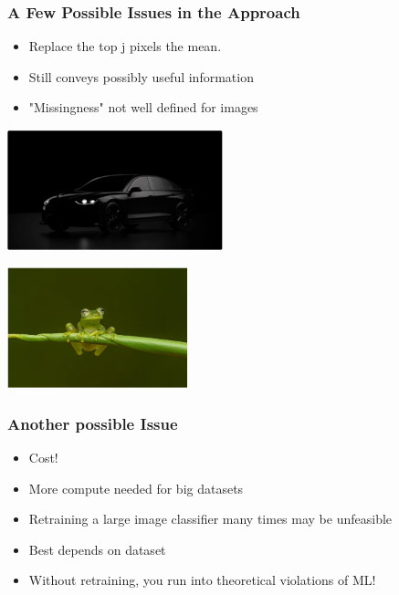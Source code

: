 \documentclass{beamer}
\theoremstyle{mystyle}
\begin{document}
\begin{frame}
    \frametitle{A Few Possible Issues in the Approach}
    \begin{itemize}
	 \item Replace the top j pixels the mean.\pause
	
        \item Still conveys possibly useful information \pause
	\item "Missingness" not well defined for images \pause
    \end{itemize}
    \begin{minipage}{0.48\textwidth}
        \centering
        \includegraphics[width=\textwidth, height=3.5cm]{black_car.png}
    \end{minipage}
    \hfill
    \begin{minipage}{0.48\textwidth}
        \centering
        \includegraphics[width=\textwidth, height=3.5cm]{green_frog2.png}
    \end{minipage}
\end{frame}
\begin{frame}
	\frametitle{Another possible Issue}
	\begin{itemize}
	\item Cost! 
	\item More compute needed for big datasets \pause
	\item Retraining a large image classifier many times may be unfeasible  \pause
	\item Best depends on dataset \\
	\item Without retraining, you run into theoretical violations of ML!
	\end{itemize}
\end{frame}
\end{document}

